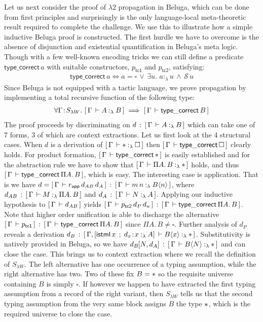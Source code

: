 \documentclass[a4paper,UKenglish]{lipics-v2016}
\newcommand{\ms}{\,}
\newcommand{\mrel}[1]{\mathrel{\ms #1 \ms}}
\newcommand{\OF}{\mrel{:}}
\newcommand{\mOr}{\mrel{\vee}}
\newcommand{\mAnd}{\mrel{\wedge}}
\newcommand{\mAll}[1]{\ensuremath{\forall} #1.\ms\ms}
\newcommand{\mEx}[1]{\ensuremath{\exists} #1.\ms\ms}
\newcommand{\SysL}{$\lambda$2\xspace}
\newcommand{\of}{\ensuremath{\!:\!}}
\newcommand{\sortLh}[1]{\ensuremath{\mathcal{S}\ms#1}}
\newcommand{\typingLh}[2]{\ensuremath{#1 \mathbin{:_{\lambda}} #2}}
\newcommand{\lpApp}[2]{#1\langle#2\rangle}
\newcommand{\Prp}{\ensuremath{\textrm{\textasteriskcentered}}}
\newcommand{\Typ}{\ensuremath{\square}}
\newcommand{\Prod}[1]{\ensuremath{\Pi #1.\,}}
\newcommand{\subst}[1]{\hphantom{|}\!\![{#1}]}
\begin{document}
Let us next consider the proof of \SysL propagation in Beluga, which can be done from first principles and surprisingly is the only language-local meta-theoretic result required to complete the challenge.
We use this to illustrate how a simple inductive Beluga proof is constructed.
The first hurdle we have to overcome is the absence of disjunction and existential quantification in Beluga's meta logic.
Though with a few well-known encoding tricks we can still define a predicate $\mathsf{type\_correct}\,a$ with suitable constructors, $p_{\mathsf{tc1}}$ and $p_{\mathsf{tc2}}$, satisfying:
\begin{align*}
  \mathsf{type\_correct}\,a \iff a = \Typ \mOr \mEx{u} \typingLh{a}{u} \mAnd \sortLh{u}
\end{align*}
Since Beluga is not equipped with a tactic language, we prove propagation by implementing a total recursive function of the following type:
\begin{align*}
  \mAll{\Gamma \of S_{\lambda W}} \bc{\Gamma}{\typingLh{A}{B}} \implies \bc{\Gamma}{\mathsf{type\_correct}\,B}
\end{align*}
The proof proceeds by discriminating on $d \OF \bc{\Gamma}{\typingLh{A}{B}}$ which can take one of 7 forms, 3 of which are context extractions.
Let us first look at the 4 structural cases.
When $d$ is a derivation of $\bc{\Gamma}{\typingLh{\Prp}{\Typ}}$ then $\bc{\Gamma}{\mathsf{type\_correct}\,\Typ}$ clearly holds.
For product formation, $\bc{\Gamma}{\mathsf{type\_correct}\,\Prp}$ is easily established and for the abstraction rule we have to show that $\bc{\Gamma}{\typingLh{\Prod{A}B}{\Prp}}$ holds, and thus $\bc{\Gamma}{\mathsf{type\_correct}\,\Prod{A}B}$, which is easy.
The interesting case is application.
That is we have $d = \bc{\Gamma}{r_{\mathsf{app}}\,d_{AB}\,d_{A}} \OF \bc{\Gamma}{\typingLh{m\,n}{\lpApp{B}{n}}}$, where $d_{AB} \OF \bc{\Gamma}{\typingLh{M}{\Prod{A}B}}$ and $d_{A} \OF \bc{\Gamma}{\typingLh{N}{A}}$.
Applying our inductive hypothesis to $[\,\Gamma\,\vdash d_{AB}\,]$ yields $\bc{\Gamma}{p_{\mathsf{tc2}}\,d_P\,d_u} \OF \bc{\Gamma}{\mathsf{type\_correct}\,\Prod{A}B}$.
Note that higher order unification is able to discharge the alternative $\bc{\Gamma}{p_{\mathsf{tc1}}} \OF \bc{\Gamma}{\mathsf{type\_correct}\,\Prod{A}B}$ since $\Prod{A}B \neq \Typ$.
Further analysis of $d_P$ reveals a derivation $d_B \OF \bc{\Gamma, [\mathsf{istml}\,x \mrel{;} d_x \of \typingLh{x}{A}]}{\typingLh{\lpApp{B}{x}}{\Prp}}$.
Substitutivity is natively provided in Beluga, so we have $d_B\subst{N,d_A} \OF \bc{\Gamma}{\typingLh{\lpApp{B}{N}}{\Prp}}$ and can close the case.
This brings us to context extraction where we recall the definition of $S_{\lambda W}$.
The left alternative has one occurrence of a typing assumption, while the right alternative has two.
Two of these fix $B = \Prp$ so the requisite universe containing $B$ is simply $\Typ$.
If however we happen to have extracted the first typing assumption from a record of the right variant, then $S_{\lambda W}$ tells us that the second typing assumption from the very same block assigns $B$ the type $\Prp$, which is the required universe to close the case.
\end{document}

